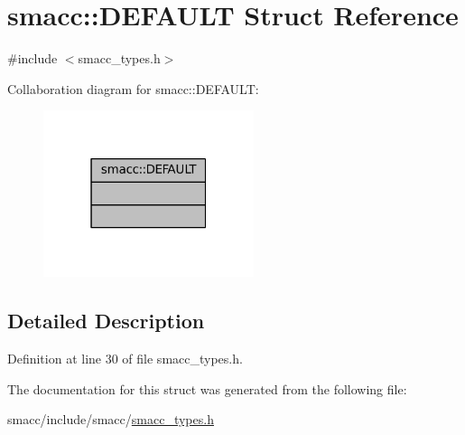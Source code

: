 \hypertarget{structsmacc_1_1DEFAULT}{}\section{smacc\+:\+:D\+E\+F\+A\+U\+LT Struct Reference}
\label{structsmacc_1_1DEFAULT}


{\ttfamily \#include $<$smacc\+\_\+types.\+h$>$}



Collaboration diagram for smacc\+:\+:D\+E\+F\+A\+U\+LT\+:
\nopagebreak
\begin{figure}[H]
\begin{center}
\leavevmode
\includegraphics[width=175pt]{structsmacc_1_1DEFAULT__coll__graph}
\end{center}
\end{figure}


\subsection{Detailed Description}


Definition at line 30 of file smacc\+\_\+types.\+h.



The documentation for this struct was generated from the following file\+:\begin{DoxyCompactItemize}
\item 
smacc/include/smacc/\hyperlink{smacc__types_8h}{smacc\+\_\+types.\+h}\end{DoxyCompactItemize}
